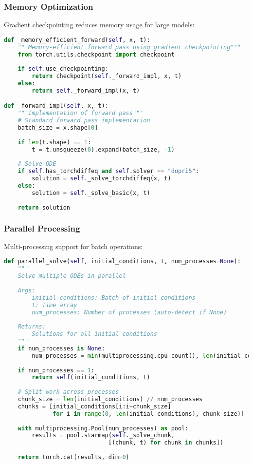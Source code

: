 \subsubsection{Memory Optimization}

Gradient checkpointing reduces memory usage for large models:

\begin{lstlisting}[language=Python, caption=Memory Optimization]
def _memory_efficient_forward(self, x, t):
    """Memory-efficient forward pass using gradient checkpointing"""
    from torch.utils.checkpoint import checkpoint
    
    if self.use_checkpointing:
        return checkpoint(self._forward_impl, x, t)
    else:
        return self._forward_impl(x, t)

def _forward_impl(self, x, t):
    """Implementation of forward pass"""
    # Standard forward pass implementation
    batch_size = x.shape[0]
    
    if len(t.shape) == 1:
        t = t.unsqueeze(0).expand(batch_size, -1)
    
    # Solve ODE
    if self.has_torchdiffeq and self.solver == "dopri5":
        solution = self._solve_torchdiffeq(x, t)
    else:
        solution = self._solve_basic(x, t)
    
    return solution
\end{lstlisting}

\subsubsection{Parallel Processing}

Multi-processing support for batch operations:

\begin{lstlisting}[language=Python, caption=Parallel Processing]
def parallel_solve(self, initial_conditions, t, num_processes=None):
    """
    Solve multiple ODEs in parallel
    
    Args:
        initial_conditions: Batch of initial conditions
        t: Time array
        num_processes: Number of processes (auto-detect if None)
    
    Returns:
        Solutions for all initial conditions
    """
    if num_processes is None:
        num_processes = min(multiprocessing.cpu_count(), len(initial_conditions))
    
    if num_processes == 1:
        return self(initial_conditions, t)
    
    # Split work across processes
    chunk_size = len(initial_conditions) // num_processes
    chunks = [initial_conditions[i:i+chunk_size] 
              for i in range(0, len(initial_conditions), chunk_size)]
    
    with multiprocessing.Pool(num_processes) as pool:
        results = pool.starmap(self._solve_chunk, 
                              [(chunk, t) for chunk in chunks])
    
    return torch.cat(results, dim=0)
\end{lstlisting}

